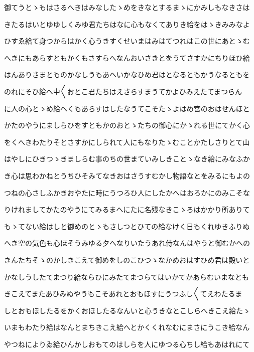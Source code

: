\documentclass[a4paper,11pt,landscape]{ltjtarticle}
\begin{document}
\par\medskip
御てうとゝもはさるへきはみなしたゝめをきなとするまゝにかみしもなきさは
\par\medskip
きたるはいとゆゆしくみゆ君たちはなに心もなくてありき給をはゝきみみなよ
\par\medskip
ひすゑ給て身つからはかく心うきすくせいまはみはてつれはこの世にあとゝむ
\par\medskip
へきにもあらすともかくもさすらへなんおいさきとをうてさすかにちりほひ給
\par\medskip
はんありさまとものかなしうもあへいかなひめ君はとなるともかうなるともを
\par\medskip
のれにそひ給へ中〱おとこ君たちはえさらすまうてかよひみえたてまつらん
\par\medskip
に人の心とゝめ給へくもあらすはしたなうてこそたゝよはめ宮のおはせんほと
\par\medskip
かたのやうにましらひをすともかのおとゝたちの御心にかゝれる世にてかく心
\par\medskip
をくへきわたりそとさすかにしられて人にもなりたゝむことかたしさりとて山
\par\medskip
はやしにひきつゝきましらむ事のちの世まていみしきことゝなき給にみなふか
\par\medskip
き心は思わかねとうちひそみてなきおはさうすむかし物語なとをみるにもよの
\par\medskip
つねの心さしふかきおやたに時にうつろひ人にしたかへはおろかにのみこそな
\par\medskip
りけれましてかたのやうにてみるまへにたに名残なきこゝろはかかり所ありて
\par\medskip
もゝてない給はしと御めのとゝもさしつとひての給なけく日もくれゆきふりぬ
\par\medskip
へき空の気色も心ほそうみゆる夕へなりいたうあれ侍なんはやうと御むかへの
\par\medskip
きんたちそゝのかしきこえて御めをしのこひつゝなかめおはすひめ君は殿いと
\par\medskip
かなしうしたてまつり給ならひにみたてまつらてはいかてかあらむいまなとも
\par\medskip
きこえてまたあひみぬやうもこそあれとおもほすにうつふし〱てえわたるま
\par\medskip
しとおもほしたるをかくおほしたるなんいと心うきなとこしらへきこえ給たゝ
\par\medskip
いまもわたり給はなんとまちきこえ給へとかくくれなむにまさにうこき給なん
\par\medskip
やつねによりゐ給ひんかしおもてのはしらを人にゆつる心ちし給もあはれにて
\end{document}
